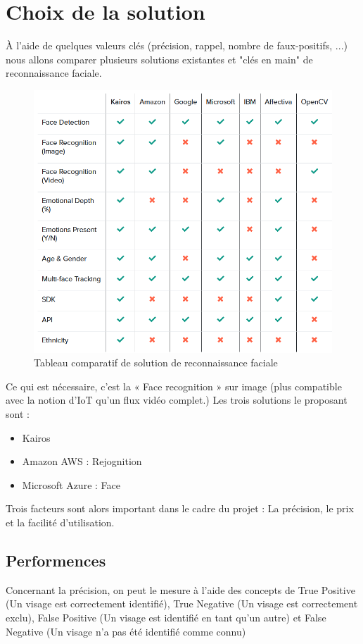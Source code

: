 \section{Choix de la solution}

À l'aide de quelques valeurs clés (précision, rappel, nombre de faux-positifs, ...) nous allons comparer plusieurs solutions existantes et "clés en main" de reconnaissance faciale.

\begin{figure}[H]
	\centering
	\includegraphics[width=12cm]{images/proto-4.png}
	\caption{Tableau comparatif de solution de reconnaissance faciale}
	\label{fig:tab-comparatif-reco}
\end{figure}

Ce qui est nécessaire, c’est la « Face recognition » sur image (plus compatible avec la notion d’IoT qu’un flux vidéo
complet.) Les trois solutions le proposant sont :

\begin{itemize}
\item Kairos
\item Amazon AWS : Rejognition
\item Microsoft Azure : Face
\end{itemize}

Trois facteurs sont alors important dans le cadre du projet : La précision, le prix et la facilité d’utilisation.

\subsection{Performences}
Concernant la précision, on peut le mesure à l’aide des concepts de True Positive (Un visage est correctement
identifié), True Negative (Un visage est correctement exclu), False Positive (Un visage est identifié en tant qu’un
autre) et False Negative (Un visage n’a pas été identifié comme connu)

